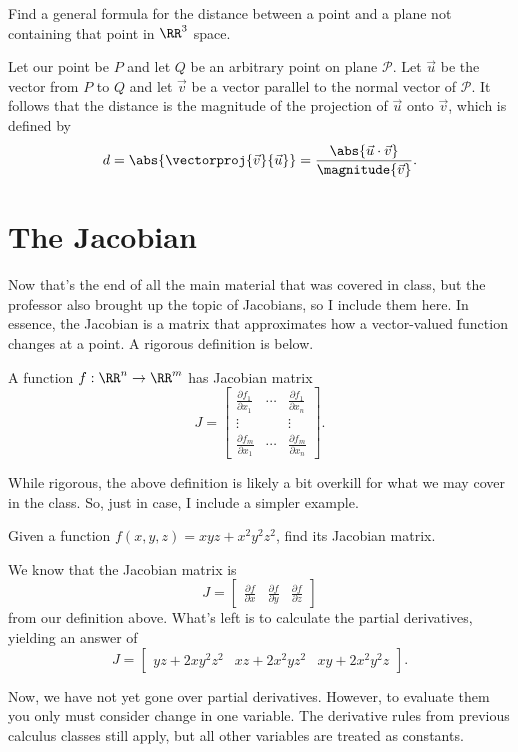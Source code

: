 \begin{example}
    Find a general formula for the distance between a point and a plane not containing that point in $\RR^{3}$ space.

    \begin{soln}
        Let our point be $P$ and let $Q$ be an arbitrary point on plane $\mathcal{P}$. Let $\vec{u}$ be the vector from $P$ to $Q$ and let $\vec{v}$ be a vector parallel to the normal vector of $\mathcal{P}$. It follows that the distance is the magnitude of the projection of $\vec{u}$ onto $\vec{v}$, which is defined by
        \[d = \abs{\vectorproj{\vec{v}}{\vec{u}}} = \frac{\abs{\vec{u} \cdot \vec{v}}}{\magnitude{\vec{v}}}.\]
    \end{soln}
\end{example}

\section{The Jacobian}

Now that's the end of all the main material that was covered in class, but the professor also brought up the topic of Jacobians, so I include them here. In essence, the Jacobian is a matrix that approximates how a vector-valued function changes at a point. A rigorous definition is below.

\begin{definition}
    A function $f : \RR^{n} \to \RR^{m}$ has Jacobian matrix
    \[J = \begin{bmatrix}
        \frac{\partial f_{1}}{\partial x_{1}} & \cdots & \frac{\partial f_{1}}{\partial x_{n}} \\
        \vdots & & \vdots \\
        \frac{\partial f_{m}}{\partial x_{1}} & \cdots & \frac{\partial f_{m}}{\partial x_{n}}
    \end{bmatrix}.\]
\end{definition}

While rigorous, the above definition is likely a bit overkill for what we may cover in the class. So, just in case, I include a simpler example.

\begin{example}
    Given a function $f(x, y, z) = xyz + x^{2}y^{2}z^{2}$, find its Jacobian matrix.

    \begin{soln}
        We know that the Jacobian matrix is
        \[J = \begin{bmatrix}
            \frac{\partial f}{\partial x} & \frac{\partial f}{\partial y} & \frac{\partial f}{\partial z}
        \end{bmatrix}\]
        from our definition above. What's left is to calculate the partial derivatives, yielding an answer of
        \[J = \begin{bmatrix}
            yz + 2xy^{2}z^{2} & xz + 2x^{2}yz^{2} & xy + 2x^{2}y^{2}z
        \end{bmatrix}.\]
    \end{soln}
\end{example}

\begin{remark}
    Now, we have not yet gone over partial derivatives. However, to evaluate them you only must consider change in one variable. The derivative rules from previous calculus classes still apply, but all other variables are treated as constants.
\end{remark}